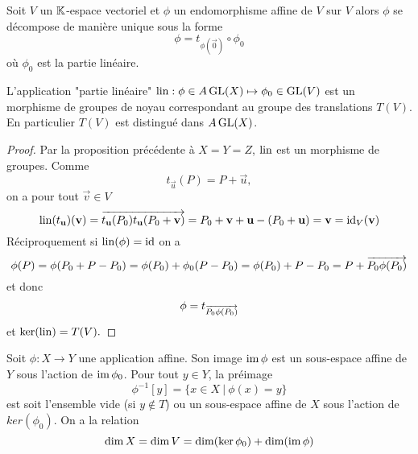 \begin{corollary}
	Soit $V$ un $\mathbb{K}$-espace vectoriel et $\phi$ un endomorphisme affine de $V$
	sur $V$ alors $\phi$ se décompose de manière unique sous la forme
	\begin{equation*}
		\phi = t_{\phi(\vec{0})}\circ\phi_0
	\end{equation*}
	où $\phi_0$ est la partie linéaire.
\end{corollary}

\begin{corollary}
	L'application "partie linéaire"
	$\operatorname{lin}: \phi \in A\operatorname{GL}(X) \mapsto \phi_0 \in \operatorname{GL}(V)$ est un morphisme de
	groupes de noyau correspondant au groupe des translations $T(V)$. En
	particulier $T(V)$ est distingué dans $A\operatorname{GL}(X)$.
\end{corollary}

\begin{proof}
	Par la proposition précédente à $X=Y=Z$, $\operatorname{lin}$ est un morphisme de
	groupes. Comme
	\begin{equation*}
		t_{\vec{u}}(P) = P + \vec{u},
	\end{equation*}
	on a pour tout $\vec{v}\in V$
	\begin{equation*}
		\operatorname{lin}(t_{\mathbf{u}})(\mathbf{v})=\overrightarrow{t_{\mathbf{u}}(P_0)t_{\mathbf{u}}(P_0 + \mathbf{v})}
		= P_0 + \mathbf{v} + \mathbf{u} - (P_0 + \mathbf{u}) = \mathbf{v} = \operatorname{id}_V(\mathbf{v})
	\end{equation*}
	Réciproquement si $\operatorname{lin}(\phi) = \operatorname{id}$ on a
	\begin{equation*}
		\phi(P) = \phi(P_0 + P - P_0) = \phi(P_0) + \phi_0(P - P_0) = \phi(P_0) +
		P - P_0 = P + \overrightarrow{P_0\phi(P_0)}
	\end{equation*}
	 et donc
	 \begin{equation*}
		 \phi=t_{\overrightarrow{P_0\phi(P_0)}}
	 \end{equation*}
	 et $\ker(\operatorname{lin}) = T(V).$
\end{proof}

\begin{corollary}
	Soit $\phi: X\to Y$ une application affine. Son image $\operatorname{im}\phi$ est un
	sous-espace affine de $Y$ sous l'action de $\operatorname{im}\phi_0$.
	Pour tout $y \in Y$, la préimage
	\begin{equation*}
		\phi^{-1}[y] = \{ x\in X\ |\ \phi(x) = y\}
	\end{equation*}
	est soit l'ensemble vide (si $y \notin T$) ou un sous-espace affine de $X$
	sous l'action de $ker(\phi_0)$. On a la relation
	\begin{equation*}
		\dim X = \dim V = \dim (\ker \phi_0) + \dim (\operatorname{im} \phi)
	\end{equation*}
\end{corollary}

